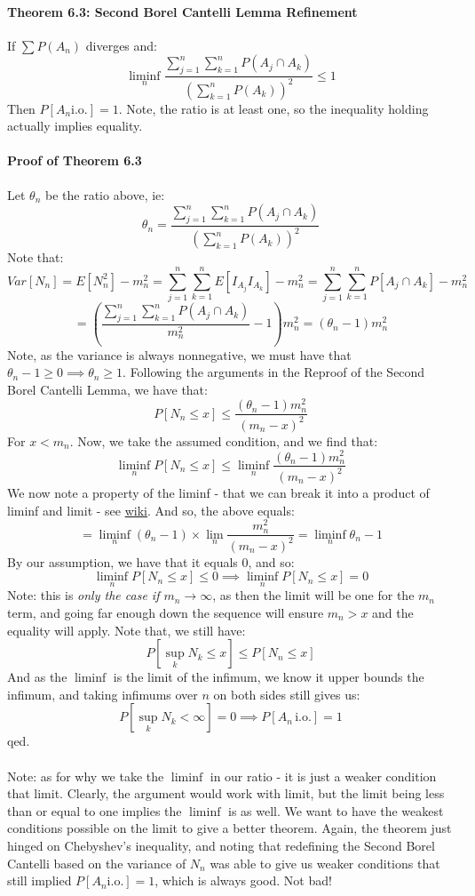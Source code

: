 \documentclass[12pt,a4paper]{article}
\newcommand{\1}[1]{\mathbbm{1}\left\{ #1 \right\}}
\newcommand{\io}{\text{i.o.}}
\begin{document}
\paragraph{Theorem 6.3: Second Borel Cantelli Lemma Refinement} If $\sum P(A_n)$ diverges and:
$$
	\liminf_n \frac{\sum_{j=1}^n \sum_{k=1}^n P(A_j \cap A_k)}{\left(\sum_{k =1}^n P(A_k)\right)^2} \leq 1
$$
Then $P[A_n \io] = 1$. Note, the ratio is at least one, so the inequality holding actually implies equality.

\paragraph{Proof of Theorem 6.3} Let $\theta_n$ be the ratio above, ie:
$$
	\theta_n = \frac{\sum_{j=1}^n \sum_{k=1}^n P(A_j \cap A_k)}{\left(\sum_{k =1}^n P(A_k)\right)^2}
$$
Note that:
$$
	Var[N_n] = E[N_n^2] - m_n^2 = \sum_{j=1}^n\sum_{k=1}^n E[I_{A_j}I_{A_k}] - m_n^2 = 
	\sum_{j=1}^n\sum_{k=1}^n P[A_j \cap A_k] - m_n^2
$$
$$
	= \left(\frac{\sum_{j=1}^n \sum_{k=1}^n P(A_j \cap A_k)}{m_n^2} - 1\right) m_n^2 = (\theta_n - 1)m_n^2
$$
Note, as the variance is always nonnegative, we must have that $\theta_n -1 \geq 0 \implies \theta_n \geq 1$. Following the arguments in the Reproof of the Second Borel Cantelli Lemma, we have that:
$$
	P\left[N_n \leq x\right] \leq \frac{(\theta_n - 1)m_n^2}{(m_n - x)^2}
$$
For $x < m_n$. Now, we take the assumed condition, and we find that:
$$
	\liminf_n P[N_n \leq x] \leq \liminf_n \frac{(\theta_n - 1)m_n^2}{(m_n - x)^2}
$$
We now note a property of the liminf - that we can break it into a product of liminf and limit - see \href{https://en.wikipedia.org/wiki/Limit_inferior_and_limit_superior#Properties}{wiki}. And so, the above equals:
$$
	= \liminf_n (\theta_n - 1) \times \lim_n \frac{m_n^2}{(m_n - x)^2} = \liminf_n \theta_n - 1
$$
By our assumption, we have that it equals $0$, and so:
$$
	\liminf_n P[N_n \leq x] \leq 0 \implies
	\liminf_n P[N_n \leq x] = 0
$$
Note: this is \textit{only the case if $m_n \to \infty$}, as then the limit will be one for the $m_n$ term, and going far enough down the sequence will ensure $m_n > x$ and the equality will apply. Note that, we still have:
$$
	P\left[\sup_k N_k \leq x\right] \leq P[N_n \leq x]
$$
And as the $\liminf$ is the limit of the infimum, we know it upper bounds the infimum, and taking infimums over $n$ on both sides still gives us:
$$
	P\left[\sup_k N_k < \infty\right] = 0 \implies P[A_n \, \io] = 1
$$
qed.
\\\\
Note: as for why we take the $\liminf$ in our ratio - it is just a weaker condition that limit. Clearly, the argument would work with limit, but the limit being less than or equal to one implies the $\liminf$ is as well. We want to have the weakest conditions possible on the limit to give a better theorem. Again, the theorem just hinged on Chebyshev's inequality, and noting that redefining the Second Borel Cantelli based on the variance of $N_n$ was able to give us weaker conditions that still implied $P[A_n \io] = 1$, which is always good. Not bad!
\end{document}
